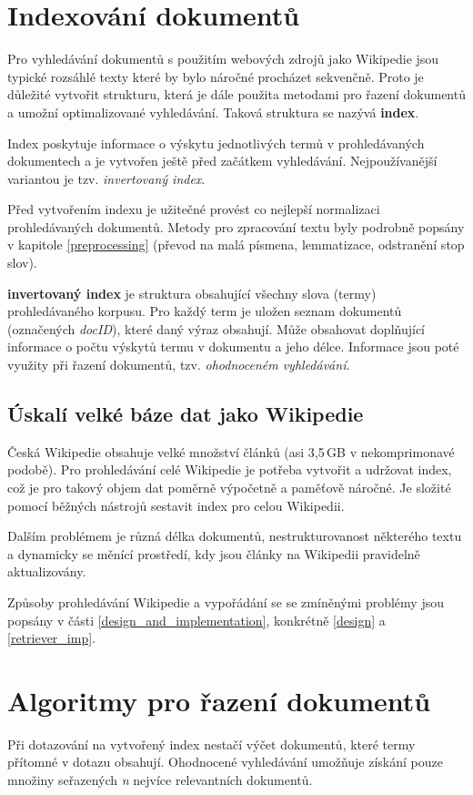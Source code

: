 \section{Indexování dokumentů}
Pro vyhledávání dokumentů s použitím webových zdrojů jako Wikipedie jsou typické rozsáhlé texty které by bylo náročné procházet sekvenčně. Proto je důležité vytvořit strukturu, která je dále použita metodami pro řazení dokumentů a umožní optimalizované vyhledávání. Taková struktura se nazývá \textbf{index}.\par
Index poskytuje informace o výskytu jednotlivých termů v prohledávaných dokumentech a je vytvořen ještě před začátkem vyhledávání. Nejpoužívanější variantou je tzv. \emph{invertovaný index}.\par
Před vytvořením indexu je užitečné provést co nejlepší normalizaci prohledávaných dokumentů. Metody pro zpracování textu byly podrobně popsány v kapitole \ref{preprocessing} (převod na malá písmena, lemmatizace, odstranění stop slov).\par
\textbf{invertovaný index} je struktura obsahující všechny slova (termy) prohledávaného korpusu. Pro každý term je uložen seznam dokumentů (označených \emph{docID}), které daný výraz obsahují. Může obsahovat doplňující informace o počtu výskytů termu v dokumentu a jeho délce. Informace jsou poté využity při řazení dokumentů, tzv. \emph{ohodnoceném vyhledávání}.

\subsection{Úskalí velké báze dat jako Wikipedie}
Česká Wikipedie obsahuje velké množství článků (asi 3,5\,GB v nekomprimonavé podobě). Pro prohledávání celé Wikipedie je potřeba vytvořit a udržovat index, což je pro takový objem dat poměrně výpočetně a paměťově náročné. Je složité pomocí běžných nástrojů sestavit index pro celou Wikipedii.\par
Dalším problémem je různá délka dokumentů, nestrukturovanost některého textu a dynamicky se měnící prostředí, kdy jsou články na Wikipedii pravidelně aktualizovány.\par\enlargethispage{\baselineskip}
Způsoby prohledávání Wikipedie a vypořádání se se zmíněnými problémy jsou popsány v části \ref{design_and_implementation}, konkrétně \ref{design} a \ref{retriever_imp}.

\section{Algoritmy pro řazení dokumentů}
Při dotazování na vytvořený index nestačí výčet dokumentů, které termy přítomné v dotazu obsahují. Ohodnocené vyhledávání umožňuje získání pouze množiny seřazených \emph{n} nejvíce relevantních dokumentů.\par

